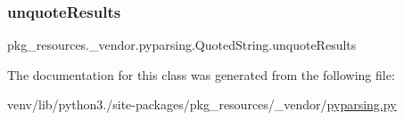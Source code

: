 \subsubsection{\texorpdfstring{unquote\+Results}{unquoteResults}}
{\footnotesize\ttfamily pkg\+\_\+resources.\+\_\+vendor.\+pyparsing.\+Quoted\+String.\+unquote\+Results}



The documentation for this class was generated from the following file\+:\begin{DoxyCompactItemize}
\item 
venv/lib/python3./site-\/packages/pkg\+\_\+resources/\+\_\+vendor/\hyperlink{pkg__resources_2__vendor_2pyparsing_8py}{pyparsing.\+py}\end{DoxyCompactItemize}
